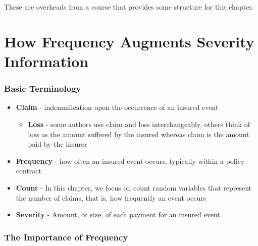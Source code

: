 \documentclass[]{book}
\providecommand{\tightlist}{%
  \setlength{\itemsep}{0pt}\setlength{\parskip}{0pt}}
\theoremstyle{definition}
\theoremstyle{definition}
\theoremstyle{definition}
\theoremstyle{remark}
\begin{document}
These are overheads from a course that provides some structure for this
chapter.

\section{How Frequency Augments Severity
Information}\label{how-frequency-augments-severity-information}

\subsubsection{Basic Terminology}\label{basic-terminology}

\begin{itemize}
\item
  \textbf{Claim} - indemnification upon the occurrence of an insured
  event

  \begin{itemize}
  \tightlist
  \item
    \textbf{Loss} - some authors use claim and loss interchangeably,
    others think of loss as the amount suffered by the insured whereas
    claim is the amount paid by the insurer
  \end{itemize}
\item
  \textbf{Frequency} - how often an insured event occurs, typically
  within a policy contract
\item
  \textbf{Count} - In this chapter, we focus on count random variables
  that represent the number of claims, that is, how frequently an event
  occurs
\item
  \textbf{Severity} - Amount, or size, of each payment for an insured
  event
\end{itemize}

\subsubsection{The Importance of
Frequency}\label{the-importance-of-frequency}
\end{document}
